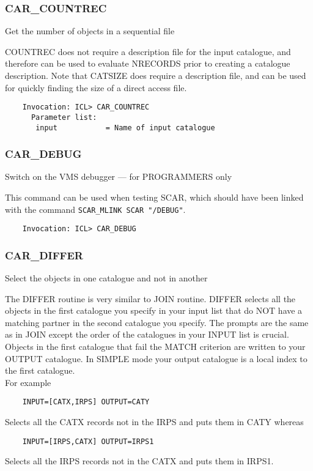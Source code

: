 \subsubsection{CAR\_COUNTREC}
 
Get the number of objects in a sequential file

COUNTREC does not require a description file for the
input catalogue, and therefore can be used to evaluate
NRECORDS prior to creating a catalogue description.
Note that CATSIZE does require a description file, and can be
used for quickly finding the size of a direct access file.

\begin{verbatim}
    Invocation: ICL> CAR_COUNTREC
      Parameter list:
       input           = Name of input catalogue
\end{verbatim}

\subsubsection{CAR\_DEBUG}

Switch on the VMS debugger --- for PROGRAMMERS only

This command can be used when testing SCAR, which should have been linked 
with the command {\tt SCAR\_MLINK SCAR "/DEBUG"}.
\begin{verbatim}
    Invocation: ICL> CAR_DEBUG
\end{verbatim}

\subsubsection{CAR\_DIFFER}

Select the objects in one catalogue and not in another

The DIFFER routine is very similar to JOIN routine.  
DIFFER selects all the objects in the first catalogue you specify in
your input list that do NOT have a matching partner in the second
catalogue you specify.
The prompts are the same as in JOIN except the order of the
catalogues in your INPUT list is crucial.
Objects in the first catalogue that fail the MATCH criterion are
written to your OUTPUT catalogue.  
In SIMPLE mode your output catalogue is a local index to the first 
catalogue.\\
For example
\begin{verbatim}
    INPUT=[CATX,IRPS] OUTPUT=CATY 
\end{verbatim}
Selects all the CATX records not in the IRPS and puts them in CATY
whereas 
\begin{verbatim}
    INPUT=[IRPS,CATX] OUTPUT=IRPS1
\end{verbatim}
Selects all the IRPS records not in the CATX and puts them in IRPS1.


